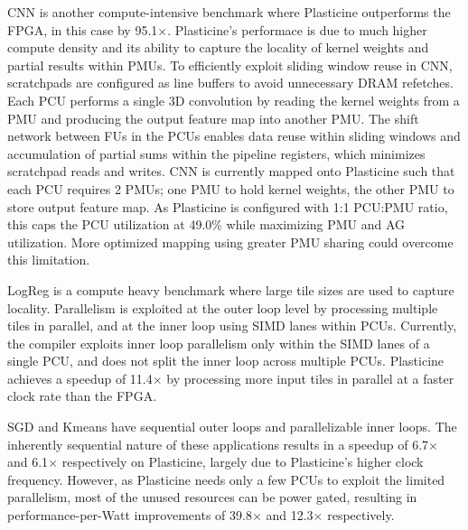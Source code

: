 CNN is another compute-intensive benchmark where Plasticine outperforms the FPGA, in this case by 95.1$\times$. Plasticine's performace is due to much higher
compute density and its ability to capture the locality of kernel weights and partial results within PMUs.
To efficiently exploit sliding window reuse in CNN,
scratchpads are configured as line buffers to avoid unnecessary DRAM refetches. Each PCU performs a single 3D convolution by reading the kernel weights from a PMU
and producing the output feature map into another PMU. The shift network between FUs in the PCUs enables data reuse within sliding windows and accumulation of partial sums
within the pipeline registers, which minimizes scratchpad reads and writes.
CNN is currently mapped onto Plasticine such that each PCU requires 2 PMUs; one PMU to hold kernel weights, the other PMU to store output feature map.
As Plasticine is configured with 1:1 PCU:PMU ratio, this caps the PCU utilization at 49.0\% while maximizing PMU and AG utilization.
More optimized mapping using greater PMU sharing could overcome this limitation.

LogReg is a compute heavy benchmark where large tile sizes are used to capture locality. Parallelism is exploited at the outer loop level
by processing multiple tiles in parallel, and at the inner loop using SIMD lanes within PCUs. 
Currently, the compiler exploits inner loop
parallelism only within the SIMD lanes of a single PCU, and does not split the inner loop across multiple PCUs. 
Plasticine achieves a speedup of 11.4$\times$
by processing more input tiles in parallel at a faster clock rate than the FPGA.

SGD and Kmeans have sequential outer loops and parallelizable inner loops.
The inherently sequential nature of these applications results in a speedup of 6.7$\times$ and 6.1$\times$ respectively on Plasticine, largely due to
Plasticine's higher clock frequency. However, as Plasticine needs only a few PCUs to exploit the limited parallelism, most of the unused resources can be power gated,
resulting in performance-per-Watt improvements of 39.8$\times$ and 12.3$\times$ respectively.

